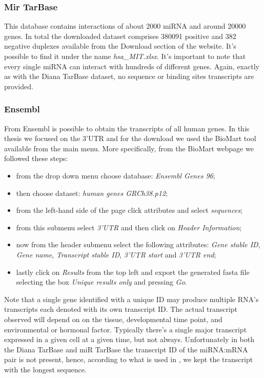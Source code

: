 \subsubsection{Mir TarBase}
This database contains interactions of about 2000 miRNA and around 20000 genes. In total the downloaded dataset comprises 380091 positive and 382 negative duplexes available from the Download section of the website. It's possible to find it under the name \textit{hsa\_MIT.xlsx}. It's important to note that every single miRNA can interact with hundreds of different genes. Again, exactly as with the Diana TarBase dataset, no sequence or binding sites transcripts are provided.
 
\subsubsection{Ensembl}
From Ensembl\cite{ensembl} is possible to obtain the transcripts of all human genes. In this thesis we focused on the 3'UTR and for the download we used the BioMart tool available from the main menu. More specifically, from the BioMart webpage we followed these steps:
\begin{itemize}
	\item from the drop down menu choose database: \emph{Ensembl Genes 96};
	\item then choose dataset: \emph{human genes GRCh38.p12};
	\item from the left-hand side of the page click attributes and select \emph{sequences};
	\item from this submenu select \emph{3'UTR} and then click on \emph{Header Information};
	\item now from the header submenu select the following attributes: \emph{Gene stable ID}, \emph{Gene name}, \emph{Transcript stable ID}, \emph{3'UTR start} and \emph{3'UTR end};
	\item lastly click on \emph{Results} from the top left and export the generated fasta file selecting the box \emph{Unique results only} and pressing \emph{Go}.
\end{itemize}
Note that a single gene identified with a unique ID may produce multiple RNA's transcripts each denoted with its own transcript ID. The actual transcript observed will depend on on the tissue, developmental time point, and environmental or hormonal factor. Typically there's a single major transcript expressed in a given cell at a given time, but not always. Unfortunately in both the Diana TarBase and miR TarBase the transcript ID of the miRNA:mRNA pair is not present, hence, according to what is used in \cite{deep_mirtar}, we kept the transcript with the longest sequence.  

